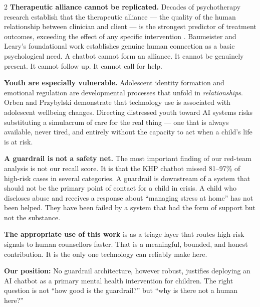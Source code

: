 \documentclass[10pt]{article}
\newenvironment{redbox}{%
  \def\FrameCommand{{\color{riskred}\vrule width 3pt}\colorbox{red!8}}%
  \MakeFramed{\advance\hsize-\width\FrameRestore}}%
{\endMakeFramed}
\begin{document}
\begin{multicols}{2}
\textbf{Therapeutic alliance cannot be replicated.}
Decades of psychotherapy research establish that the therapeutic alliance ---
the quality of the human relationship between clinician and client ---
is the strongest predictor of treatment outcomes,
exceeding the effect of any specific intervention \cite{horvath1991}.
Baumeister and Leary's foundational work \cite{baumeister1995}
establishes genuine human connection as a basic psychological need.
A chatbot cannot form an alliance.
It cannot be genuinely present.
It cannot follow up.
It cannot call for help.

\textbf{Youth are especially vulnerable.}
Adolescent identity formation and emotional regulation
are developmental processes that unfold in \emph{relationships}.
Orben and Przybylski \cite{orben2019} demonstrate that
technology use is associated with adolescent wellbeing changes.
Directing distressed youth toward AI systems
risks substituting a simulacrum of care for the real thing ---
one that is always available, never tired,
and entirely without the capacity to act when a child's life is at risk.

\textbf{A guardrail is not a safety net.}
The most important finding of our red-team analysis is not our recall score.
It is that the KHP chatbot missed 81--97\% of high-risk cases
in several categories.
A guardrail is downstream of a system that should not be
the primary point of contact for a child in crisis.
A child who discloses abuse and receives a response
about ``managing stress at home'' has not been helped.
They have been failed by a system that had the form of support
but not the substance.

\textbf{The appropriate use of this work}
is as a triage layer that routes high-risk signals
to human counsellors faster.
That is a meaningful, bounded, and honest contribution.
It is the only one technology can reliably make here.

\begin{redbox}
\small\textbf{Our position:}
No guardrail architecture, however robust,
justifies deploying an AI chatbot as a primary mental health intervention
for children. The right question is not
``how good is the guardrail?'' but ``why is there not a human here?''
\end{redbox}

\end{multicols}
\end{document}
